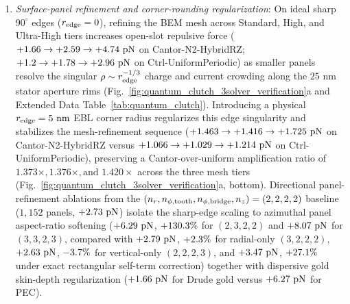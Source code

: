 \documentclass[pdflatex,sn-nature]{sn-jnl}
\DeclareRobustCommand{\roundtwo}[1]{\fpeval{round(#1,2)}}
\DeclareRobustCommand{\roundthree}[1]{\fpeval{round(#1,3)}}
\begin{document}
\begin{enumerate}
    \item \emph{Surface-panel refinement and corner-rounding regularization}: On ideal sharp $90^\circ$ edges ($r_{\rm edge} = 0$), refining the BEM mesh across Standard, High, and Ultra-High tiers increases open-slot repulsive force ($+\roundtwo{\CantorNtwoHybridrzBemStdFZPn} \to +\roundtwo{\CantorNtwoHybridrzBemHighFZPn} \to +\roundtwo{\CantorNtwoHybridrzBemUltraFZPn}\text{ pN}$ on Cantor-N2-HybridRZ; $+\roundtwo{\CtrlUniformperiodicBemThetathreeFZPn} \to +\roundtwo{\CtrlUniformperiodicBemHighThetathreeFZPn} \to +\roundtwo{\CtrlUniformperiodicBemUltraThetathreeFZPn}\text{ pN}$ on Ctrl-UniformPeriodic) as smaller panels resolve the singular $\rho \sim r_{\rm edge}^{-1/3}$ charge and current crowding along the $25\text{ nm}$ stator aperture rims (Fig.~\ref{fig:quantum_clutch_3solver_verification}a and Extended Data Table~\ref{tab:quantum_clutch}). Introducing a physical $r_{\rm edge} = 5\text{ nm}$ EBL corner radius regularizes this edge singularity and stabilizes the mesh-refinement sequence ($+\roundthree{\CantorNtwoHybridrzBemRfiveNmStdFZPn} \to +\roundthree{\CantorNtwoHybridrzBemRfiveNmHighFZPn} \to +\roundthree{\CantorNtwoHybridrzBemRfiveNmUltraFZPn}\text{ pN}$ on Cantor-N2-HybridRZ versus $+\roundthree{\CtrlUniformperiodicBemRfiveNmStdFZPn} \to +\roundthree{\CtrlUniformperiodicBemRfiveNmHighFZPn} \to +\roundthree{\CtrlUniformperiodicBemRfiveNmUltraFZPn}\text{ pN}$ on Ctrl-UniformPeriodic), preserving a Cantor-over-uniform amplification ratio of $1.373\times, 1.376\times, \text{and } 1.420\times$ across the three mesh tiers (Fig.~\ref{fig:quantum_clutch_3solver_verification}a, bottom). Directional panel-refinement ablations from the $(n_r, n_{\phi,\rm tooth}, n_{\phi,\rm bridge}, n_z) = (2,2,2,2)$ baseline ($1{,}152$ panels, $+\roundtwo{\BemConvDirBaseFzPn}\text{ pN}$) isolate the sharp-edge scaling to azimuthal panel aspect-ratio softening ($+\roundtwo{\BemConvDirAzimuthalFzPn}\text{ pN}$, $+130.3{}\%$ for $(2,3,2,2)$ and $+\roundtwo{\BemConvDirHighFzPn}\text{ pN}$ for $(3,3,2,3)$, compared with $+\roundtwo{\BemConvDirRadialFzPn}\text{ pN}$, $+2.3{}\%$ for radial-only $(3,2,2,2)$, $+\roundtwo{\BemConvDirVerticalFzPn}\text{ pN}$, $-3.7{}\%$ for vertical-only $(2,2,2,3)$, and $+\roundtwo{\BemConvDirRectSelfFzPn}\text{ pN}$, $+27.1{}\%$ under exact rectangular self-term correction) together with dispersive gold skin-depth regularization ($+\roundtwo{\CantorNtwoHybridrzBemStdFZPn}\text{ pN}$ for Drude gold versus $+\roundtwo{\BemConvStdNxitwofourPecFzPn}\text{ pN}$ for PEC).

\end{enumerate}
\end{document}
